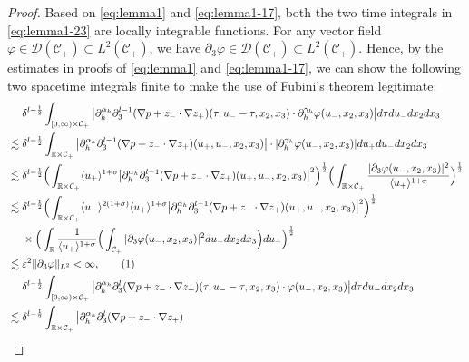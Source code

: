 \documentclass[10pt,reqno]{amsart}
\numberwithin{equation}{section}
\begin{document}
\begin{proof}
	 
	Based on \eqref{eq:lemma1} and \eqref{eq:lemma1-17}, 
	both the two time integrals in \eqref{eq:lemma1-23} are locally integrable functions. 
For any vector field  $\varphi\in \mathcal{D}(\mathcal{C}_+)\subset L^2(\mathcal{C}_+)$, we have $\partial_3\varphi\in \mathcal{D}(\mathcal{C}_+)\subset L^2(\mathcal{C}_+)$. Hence, by the estimates in proofs of \eqref{eq:lemma1} and \eqref{eq:lemma1-17}, we can show   the following two spacetime integrals  finite to make the use of Fubini's theorem legitimate:
	\begin{align*}
		&\ \ \ \
		\delta^{l-\frac{1}{2}}\int_{[0,\infty)\times \mathcal{C}_+}\big|\partial_h^{\alpha_h}\partial_3^{l-1}(\nabla p+z_{-}\cdot\nabla z_{+}) 
		(\tau,u_--\tau,x_2,x_3)\cdot\partial_{h}^{\gamma_h}\varphi(u_-,x_2,x_3)\big|d\tau du_-dx_2dx_3\\
		&\lesssim \delta^{l-\frac{1}{2}}\int_{\mathbb{R}\times\mathcal{C}_+}\big|\partial_h^{\alpha_h}\partial_3^{l-1}(\nabla p+z_{-}\cdot\nabla z_{+}) 
		(u_+,u_-,x_2,x_3)\big|\cdot|\partial_{h}^{\gamma_h}\varphi(u_-,x_2,x_3)|du_+du_-dx_2dx_3\\
		&\lesssim
		\delta^{l-\frac{1}{2}}\Big(\int_{\mathbb{R}\times \mathcal{C}_+}\langle  u_+\rangle^{1+\sigma}\big|\partial_h^{\alpha_h}\partial_3^{l-1}(\nabla p+z_{-}\cdot\nabla z_{+})(u_+,u_-,x_2,x_3)\big|^2 \Big)^{\frac{1}{2}}
		\Big(\int_{\mathbb{R}\times \mathcal{C}_+}\frac{|\partial_3\varphi(u_-,x_2,x_3)|^2}{\langle u_+\rangle^{1+\sigma}}\Big)^{\frac{1}{2}}\\
		&\lesssim\delta^{l-\frac{1}{2}}\Big(\int_{\mathbb{R}\times \mathcal{C}_+}\langle u_-\rangle^{2(1+\sigma)}\langle u_+\rangle^{1+\sigma}\big|\partial_h^{\alpha_h}\partial_3^{l-1}(\nabla p+z_{-}\cdot\nabla z_{+}) (u_+,u_-,x_2,x_3)\big|^2\Big)^{\frac{1}{2}}\\
		&\ \ \ \ \times \Big(\int_{\mathbb{R}}\frac{1}{\langle u_+\rangle^{1+\sigma}}\Big(\int_{\mathcal{C}_+} |\partial_3 \varphi(u_-,x_2,x_3)|^2  du_-dx_2dx_3 \Big)du_+\Big)^{\frac{1}{2}}\\
		&\lesssim\varepsilon^2\|\partial_3\varphi\|_{L^2}<\infty,\stepcounter{equation}\tag{\theequation}\label{eq:lemma1-24}\\
		&\ \ \ \
		\delta^{l-\frac{1}{2}}\int_{[0,\infty)\times \mathcal{C}_+}\big|\partial_h^{\alpha_h}\partial_3^l(\nabla p+z_{-}\cdot\nabla z_{+}) 
		(\tau,u_--\tau,x_2,x_3)\cdot\varphi(u_-,x_2,x_3)\big|d\tau du_-dx_2dx_3\\
		&\lesssim \delta^{l-\frac{1}{2}}\int_{\mathbb{R}\times\mathcal{C}_+}\big|\partial_h^{\alpha_h}\partial_3^l(\nabla p+z_{-}\cdot\nabla z_{+}) 

\end{align*}
\end{proof}
\end{document}
